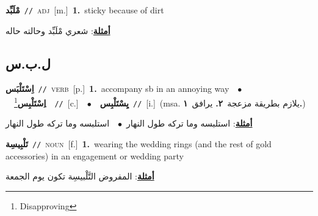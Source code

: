 \documentclass[10pt,a4paper,twoside]{article} %
\begin{document}
\begin{multicols}{2}
{\setlength\topsep{0pt}\textbf{\foreignlanguage{arabic}{مْلَبِّد}}\ {\color{gray}\texttt{//}\color{black}}\ \textsc{adj}\ [m.]\ \textbf{1.}~sticky because of dirt\  \begin{flushright}\color{gray}\foreignlanguage{arabic}{\textbf{\underline{\foreignlanguage{arabic}{أمثلة}}}: شعري مْلَبِّد وحالته حاله}\end{flushright}\color{black}} \vspace{2mm}

\vspace{-3mm}
\subsection*{\color{blue}\foreignlanguage{arabic}{ل.ب.س}\color{blue}{}} 

{\setlength\topsep{0pt}\textbf{\foreignlanguage{arabic}{اِسْتَلْبَس}}\ {\color{gray}\texttt{//}\color{black}}\ \textsc{verb}\ [p.]\ \textbf{1.}~accompany sb in an annoying way\ \ $\bullet$\ \ \setlength\topsep{0pt}\textbf{\foreignlanguage{arabic}{اِسْتَلْبِس}}\footnote{Disapproving}\ \ {\color{gray}\texttt{//}\color{black}}\ [c.]\ \ $\bullet$\ \ \setlength\topsep{0pt}\textbf{\foreignlanguage{arabic}{يِسْتَلْبِس}}\ {\color{gray}\texttt{//}\color{black}}\ [i.]\ \color{gray}(msa. \foreignlanguage{arabic}{يلازم بطريقة مزعجة}~\foreignlanguage{arabic}{\textbf{٢.}}  \foreignlanguage{arabic}{يرافق}~\foreignlanguage{arabic}{\textbf{١.}})\color{black}\  \begin{flushright}\color{gray}\foreignlanguage{arabic}{\textbf{\underline{\foreignlanguage{arabic}{أمثلة}}}: استلبسه وما تركه طول النهار\ $\bullet$\ \  استلبسه وما تركه طول النهار}\end{flushright}\color{black}} \vspace{2mm}

{\setlength\topsep{0pt}\textbf{\foreignlanguage{arabic}{تَلْبِيسِة}}\ {\color{gray}\texttt{//}\color{black}}\ \textsc{noun}\ [f.]\ \textbf{1.}~wearing the wedding rings (and the rest of gold accessories) in an engagement or wedding party\  \begin{flushright}\color{gray}\foreignlanguage{arabic}{\textbf{\underline{\foreignlanguage{arabic}{أمثلة}}}: المفروض التَّلْبيسِة تكون يوم الجمعة}\end{flushright}\color{black}} \vspace{2mm}


\end{multicols}
\end{document}
